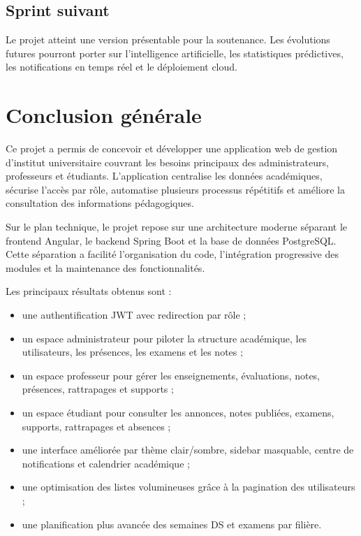 \documentclass[12pt,a4paper]{report}
\begin{document}
\section{Sprint suivant}

Le projet atteint une version présentable pour la soutenance. Les évolutions futures pourront porter sur l'intelligence artificielle, les statistiques prédictives, les notifications en temps réel et le déploiement cloud.

\chapter*{Conclusion générale}

Ce projet a permis de concevoir et développer une application web de gestion d'institut universitaire couvrant les besoins principaux des administrateurs, professeurs et étudiants. L'application centralise les données académiques, sécurise l'accès par rôle, automatise plusieurs processus répétitifs et améliore la consultation des informations pédagogiques.

Sur le plan technique, le projet repose sur une architecture moderne séparant le frontend Angular, le backend Spring Boot et la base de données PostgreSQL. Cette séparation a facilité l'organisation du code, l'intégration progressive des modules et la maintenance des fonctionnalités.

Les principaux résultats obtenus sont :

\begin{itemize}[itemsep=0.4em]
    \item une authentification JWT avec redirection par rôle ;
    \item un espace administrateur pour piloter la structure académique, les utilisateurs, les présences, les examens et les notes ;
    \item un espace professeur pour gérer les enseignements, évaluations, notes, présences, rattrapages et supports ;
    \item un espace étudiant pour consulter les annonces, notes publiées, examens, supports, rattrapages et absences ;
    \item une interface améliorée par thème clair/sombre, sidebar masquable, centre de notifications et calendrier académique ;
    \item une optimisation des listes volumineuses grâce à la pagination des utilisateurs ;
    \item une planification plus avancée des semaines DS et examens par filière.
\end{itemize}
\end{document}
